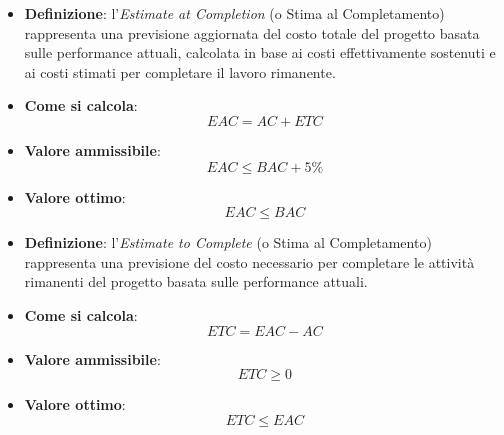 \begin{itemize}
	\item \textbf{Definizione}: l'\textit{Estimate at Completion} (o Stima al Completamento) rappresenta una previsione aggiornata del costo totale del progetto basata sulle performance attuali, calcolata in base ai costi effettivamente sostenuti e ai costi stimati per completare il lavoro rimanente.
	\item \textbf{Come si calcola}: \begin{equation*}EAC = AC + ETC\end{equation*}
	\item \textbf{Valore ammissibile}: \begin{equation*}EAC \leq BAC + 5\%\end{equation*}
	\item \textbf{Valore ottimo}: \begin{equation*}EAC \leq BAC\end{equation*}
\end{itemize}

\begin{itemize}
	\item \textbf{Definizione}: l'\textit{Estimate to Complete} (o Stima al Completamento) rappresenta una previsione del costo necessario per completare le attività rimanenti del progetto basata sulle performance attuali.
	\item \textbf{Come si calcola}: \begin{equation*}ETC = EAC - AC\end{equation*}
	\item \textbf{Valore ammissibile}: \begin{equation*}ETC \geq 0\end{equation*}
	\item \textbf{Valore ottimo}: \begin{equation*}ETC \leq EAC\end{equation*}
\end{itemize}

